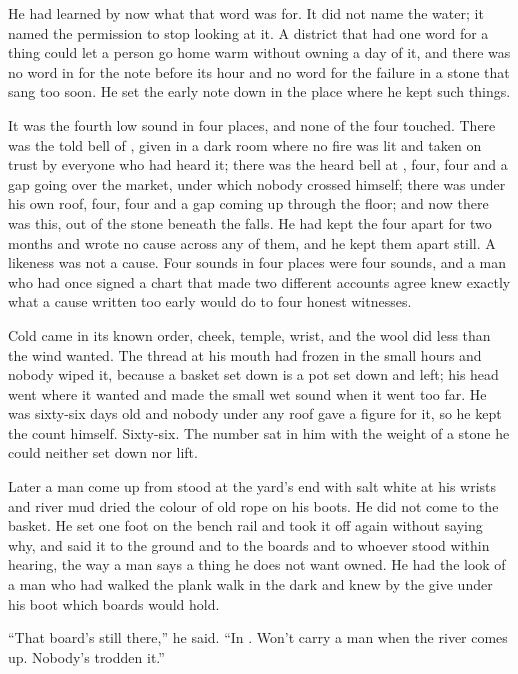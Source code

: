He had learned by now what that word was for. It did not name the water; it named the permission to stop looking at it. A district that had one word for a thing could let a person go home warm without owning a day of it, and there was no word in  for the note before its hour and no word for the failure in a stone that sang too soon. He set the early note down in the place where he kept such things.

It was the fourth low sound in four places, and none of the four touched. There was the told bell of , given in a dark room where no fire was lit and taken on trust by everyone who had heard it; there was the heard bell at , four, four and a gap going over the market, under which nobody crossed himself; there was  under his own roof, four, four and a gap coming up through the floor; and now there was this, out of the stone beneath the falls. He had kept the four apart for two months and wrote no cause across any of them, and he kept them apart still. A likeness was not a cause. Four sounds in four places were four sounds, and a man who had once signed a chart that made two different accounts agree knew exactly what a cause written too early would do to four honest witnesses.

Cold came in its known order, cheek, temple, wrist, and the wool did less than the wind wanted. The thread at his mouth had frozen in the small hours and nobody wiped it, because a basket set down is a pot set down and left; his head went where it wanted and made the small wet sound when it went too far. He was sixty-six days old and nobody under any roof gave a figure for it, so he kept the count himself. Sixty-six. The number sat in him with the weight of a stone he could neither set down nor lift.

\scenebreak

Later a man come up from  stood at the yard's end with salt white at his wrists and river mud dried the colour of old rope on his boots. He did not come to the basket. He set one foot on the bench rail and took it off again without saying why, and said it to the ground and to the boards and to whoever stood within hearing, the way a man says a thing he does not want owned. He had the look of a man who had walked the plank walk in the dark and knew by the give under his boot which boards would hold.

“That board's still there,” he said. “In . Won't carry a man when the river comes up. Nobody's trodden it.”

